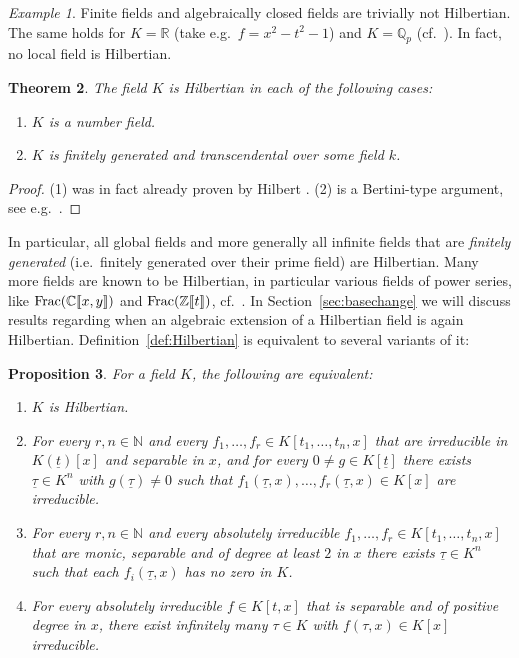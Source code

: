 \documentclass[10pt,a4paper]{amsart}
\theoremstyle{plain}
\newtheorem{theorem}{Theorem}
\newtheorem{proposition}[theorem]{Proposition}
\theoremstyle{remark}
\newtheorem{example}[theorem]{Example}
\numberwithin{theorem}{section}
\begin{document}
\begin{example}
Finite fields and algebraically closed fields are trivially not Hilbertian.
The same holds for $K=\mathbb{R}$ (take e.g.~$f=x^2-t^2-1$) and $K=\mathbb{Q}_p$ (cf.~\cite[Example 15.5.5]{FJ}).
In fact, no local field is Hilbertian.
\end{example}

\begin{theorem}\label{thm:Hilbertian}
The field $K$ is Hilbertian in each of the following cases:
\begin{enumerate}
    \item $K$ is a number field.
    \item $K$ is finitely generated and transcendental over some field $k$.
\end{enumerate}
\end{theorem}

\begin{proof}
(1) was in fact already proven by Hilbert \cite{Hilbert}.
(2) is a Bertini-type argument, see e.g.~\cite[Theorem 13.4.2]{FJ}.
\end{proof}

In particular, all global fields 
and more generally all infinite fields that are {\em finitely generated} (i.e.~finitely generated over their prime field) are Hilbertian.
Many more fields are known to be Hilbertian, 
in particular various fields of power series, like
${\rm Frac}(\mathbb{C}[\![x,y]\!])$ and ${\rm Frac}(\mathbb{Z}[\![t]\!])$, cf.~\cite{Weissauer,FehmParan}.
In Section~\ref{sec:basechange} we will discuss results regarding when 
an algebraic extension of a Hilbertian field is again Hilbertian.
Definition~\ref{def:Hilbertian} is equivalent to several variants of it:
 

\begin{proposition}\label{prop:Hilbertian}
For a field $K$, the following are equivalent:
\begin{enumerate}
    \item $K$ is Hilbertian.
    \item For every 
    $r,n\in\mathbb{N}$ and every
    $f_1,\dots,f_r\in K[t_1,\dots,t_n,x]$ that are irreducible in $K(\underline{t})[x]$
    and separable in $x$,
    and for every $0\neq g\in K[\underline{t}]$
    there exists $\underline{\tau}\in K^n$ with $g(\underline{\tau})\neq 0$
    such that $f_1(\underline{\tau},x),\dots,f_r(\underline{\tau},x)\in K[x]$ are irreducible.
    \item For every $r,n\in\mathbb{N}$ and every absolutely irreducible $f_1,\dots,f_r\in K[t_1,\dots,t_n,x]$ that are monic, separable and of degree at least $2$ in $x$
    there exists $\underline{\tau}\in K^n$ such that each $f_i(\underline{\tau},x)$ has no zero in $K$.
    \item For every absolutely irreducible $f\in K[t,x]$ that is separable and of positive degree in $x$, there exist infinitely many $\tau \in K$ with $f(\tau,x)\in K[x]$ irreducible.
\end{enumerate}
\end{proposition}
\end{document}
